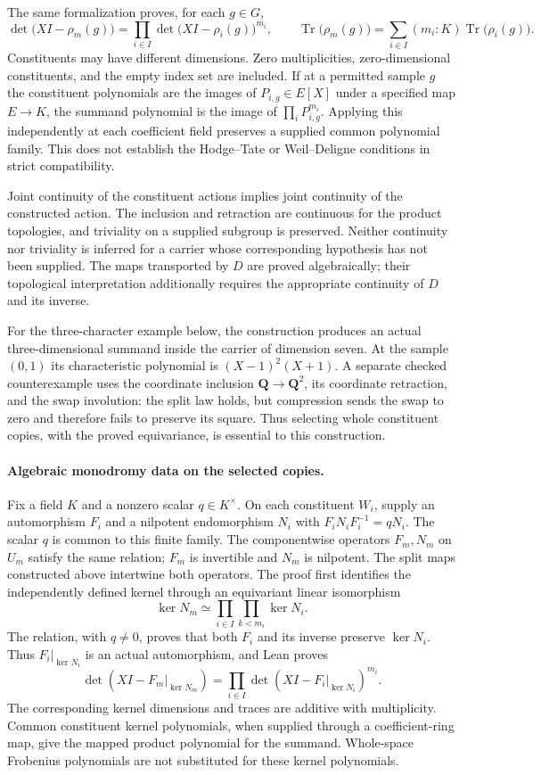 \documentclass[11pt]{article}
\theoremstyle{definition}
\theoremstyle{remark}
\begin{document}
The same formalization proves, for each $g\in G$,
\[
 \det\bigl(XI-\rho_m(g)\bigr)
 =\prod_{i\in I}\det\bigl(XI-\rho_i(g)\bigr)^{m_i},
 \qquad
 \operatorname{Tr}\bigl(\rho_m(g)\bigr)
 =\sum_{i\in I}(m_i:K)\operatorname{Tr}\bigl(\rho_i(g)\bigr).
\]
Constituents may have different dimensions. Zero multiplicities, zero-dimensional
constituents, and the empty index set are included. If at a permitted sample
$g$ the constituent polynomials are the images of $P_{i,g}\in E[X]$ under a
specified map $E\to K$, the summand polynomial is the image of
$\prod_iP_{i,g}^{m_i}$. Applying this independently at each coefficient field
preserves a supplied common polynomial family. This does not establish the
Hodge--Tate or Weil--Deligne conditions in strict compatibility.

Joint continuity of the constituent actions implies joint continuity of the
constructed action. The inclusion and retraction are continuous for the
product topologies, and triviality on a supplied subgroup is preserved.
Neither continuity nor triviality is inferred for a carrier whose corresponding
hypothesis has not been supplied. The maps transported by $D$ are proved
algebraically; their topological interpretation additionally requires the
appropriate continuity of $D$ and its inverse.

For the three-character example below, the construction produces an actual
three-dimensional summand inside the carrier of dimension seven. At the sample
$(0,1)$ its characteristic polynomial is $(X-1)^2(X+1)$. A separate checked
counterexample uses the coordinate inclusion $\mathbf Q\to\mathbf Q^2$, its
coordinate retraction, and the swap involution: the split law holds, but
compression sends the swap to zero and therefore fails to preserve its square.
Thus selecting whole constituent copies, with the proved equivariance, is
essential to this construction.

\paragraph{Algebraic monodromy data on the selected copies.}
Fix a field $K$ and a nonzero scalar $q\in K^\times$. On each constituent
$W_i$, supply an automorphism $F_i$ and a nilpotent endomorphism $N_i$ with
$F_iN_iF_i^{-1}=qN_i$. The scalar $q$ is common to this finite family.
The componentwise operators $F_m,N_m$ on $U_m$ satisfy the same relation;
$F_m$ is invertible and $N_m$ is nilpotent. The split maps constructed above
intertwine both operators. The proof first identifies the independently defined
kernel through an equivariant linear isomorphism
\[
 \ker N_m\simeq\prod_{i\in I}\prod_{k<m_i}\ker N_i.
\]
The relation, with $q\ne0$, proves that both $F_i$ and its inverse preserve
$\ker N_i$. Thus $F_i|_{\ker N_i}$ is an actual automorphism, and Lean proves
\[
 \det(XI-F_m|_{\ker N_m})
   =\prod_{i\in I}\det(XI-F_i|_{\ker N_i})^{m_i}.
\]
The corresponding kernel dimensions and traces are additive with multiplicity.
Common constituent kernel polynomials, when supplied through a coefficient-ring
map, give the mapped product polynomial for the summand. Whole-space Frobenius
polynomials are not substituted for these kernel polynomials.
\end{document}
